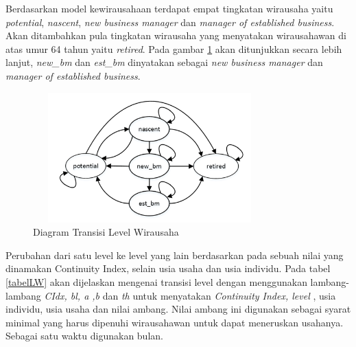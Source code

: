 \documentclass[a4paper,twoside]{article}
\begin{document}
\begin{enumerate}
\begin{enumerate}
Berdasarkan model kewirausahaan terdapat empat tingkatan wirausaha yaitu \textit{potential}, \textit{nascent}, \textit{new business manager} dan \textit{manager of established business}. Akan ditambahkan pula tingkatan wirausaha yang menyatakan wirausahawan di atas umur 64 tahun yaitu \textit{retired}. Pada gambar \ref{fig:tingkatwirausaha} akan ditunjukkan secara lebih lanjut, \textit{new\_bm} dan \textit{est\_bm} dinyatakan sebagai \textit{new business manager} dan \textit{manager of established business}.


	\begin{figure} [H]
		\centering  
		\includegraphics[width=9cm, height=5cm]{tingkatwirausaha} 
		\caption[Diagram Transisi Level Wirausaha]{Diagram Transisi Level Wirausaha} 
		\label{fig:tingkatwirausaha} 
	\end{figure}
	

Perubahan dari satu level ke level yang lain berdasarkan pada sebuah nilai yang dinamakan Continuity Index, selain usia usaha dan usia individu. Pada tabel \ref{tabelLW} akan dijelaskan mengenai transisi level dengan menggunakan lambang-lambang \textit{CIdx, bl, a ,b} dan \textit{th} untuk menyatakan \textit{Continuity Index, level} , usia individu, usia usaha dan nilai ambang. Nilai ambang ini digunakan sebagai syarat minimal yang harus dipenuhi wirausahawan untuk dapat meneruskan usahanya. Sebagai satu waktu digunakan bulan.


\end{enumerate}
\end{enumerate}
\end{document}
